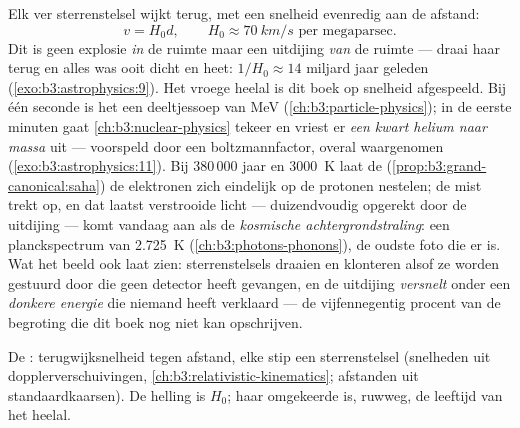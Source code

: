 \begin{definition}\label{def:b3:astrophysics:hubble}
Elk ver sterrenstelsel wijkt terug, met een snelheid evenredig aan de afstand:
\[
v = H_0d , \qquad H_0 \approx \qty{70}{km/s}
\text{ per megaparsec} .
\]
Dit is geen explosie \emph{in} de ruimte maar een uitdijing
\emph{van} de ruimte --- draai haar terug en alles was ooit
dicht en heet: $1/H_0 \approx 14$ miljard jaar geleden
(\cref{exo:b3:astrophysics:9}). Het vroege heelal is dit boek
op snelheid afgespeeld. Bij één seconde is het een deeltjessoep van \unit{MeV}
(\cref{ch:b3:particle-physics}); in de eerste minuten gaat
\cref{ch:b3:nuclear-physics} tekeer en vriest er
\emph{een kwart helium naar massa} uit --- voorspeld door een boltzmannfactor,
overal waargenomen
(\cref{exo:b3:astrophysics:11}). Bij 380\,000 jaar en
\qty{3000}{K} laat de 
(\cref{prop:b3:grand-canonical:saha}) de elektronen zich eindelijk
op de protonen nestelen; de mist trekt op, en dat laatst verstrooide licht ---
duizendvoudig opgerekt door de uitdijing --- komt vandaag aan als de
\emph{kosmische achtergrondstraling}: een planckspectrum van
\qty{2.725}{K} (\cref{ch:b3:photons-phonons}), de oudste foto
die er is. Wat het beeld ook laat zien: sterrenstelsels draaien en klonteren
alsof ze worden gestuurd door \emph{} die geen detector heeft gevangen, en
de uitdijing \emph{versnelt} onder een \emph{donkere energie}
die niemand heeft verklaard --- de vijfennegentig procent van de begroting
die dit boek nog niet kan opschrijven.
\end{definition}

\begin{omfigure}

{\small De : terugwijksnelheid tegen afstand, elke stip
een sterrenstelsel (snelheden uit dopplerverschuivingen,
\cref{ch:b3:relativistic-kinematics}; afstanden uit standaard\-kaarsen).
De helling is $H_0$; haar omgekeerde is, ruwweg, de leeftijd
van het heelal.}
\end{omfigure}

